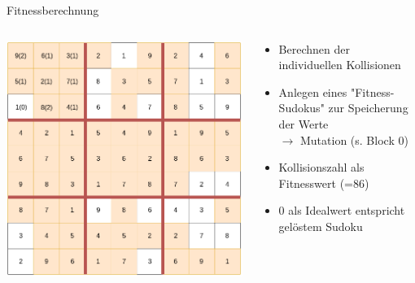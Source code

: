 \begin{frame}{Fitnessberechnung}
    \begin{columns}[T] %
        \begin{column}{0.55\textwidth}
            \vspace*{0.2cm}
            \includegraphics[width=\textwidth]{Pictures/Collision-Fitness.png}
        \end{column}
        \begin{column}{0.55\textwidth}
            \begin{itemize}
                \vspace*{0.25cm}
                \item Berechnen der individuellen Kollisionen
                \item Anlegen eines "{}Fitness-Sudokus{}" zur Speicherung der Werte \\
                \(\rightarrow\) Mutation (s. Block 0) 
                \item Kollisionszahl als Fitnesswert (=86)
                \item 0 als Idealwert entspricht gelöstem Sudoku
            \end{itemize}
        \end{column}
    \end{columns}
\end{frame}
